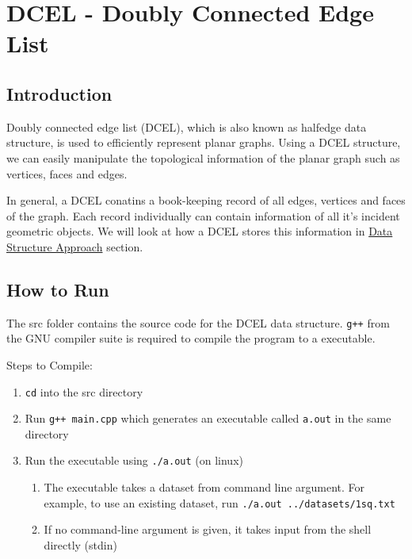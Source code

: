 \hypertarget{dcel---doubly-connected-edge-list}{%
\section{DCEL - Doubly Connected Edge
List}\label{dcel---doubly-connected-edge-list}}

\hypertarget{introduction}{%
\subsection{Introduction}\label{introduction}}

Doubly connected edge list (DCEL), which is also known as halfedge data
structure, is used to efficiently represent planar graphs. Using a DCEL
structure, we can easily manipulate the topological information of the
planar graph such as vertices, faces and edges.

In general, a DCEL conatins a book-keeping record of all edges, vertices
and faces of the graph. Each record individually can contain information
of all it's incident geometric objects. We will look at how a DCEL
stores this information in
\protect\hyperlink{data-structure-approach}{Data Structure Approach}
section.

\hypertarget{how-to-run}{%
\subsection{How to Run}\label{how-to-run}}

The src folder contains the source code for the DCEL data structure.
\texttt{g++} from the GNU compiler suite is required to compile the
program to a executable.

Steps to Compile:

\begin{enumerate}
\def\labelenumi{\arabic{enumi})}
\tightlist
\item
  \texttt{cd} into the src directory
\item
  Run \texttt{g++\ main.cpp} which generates an executable called
  \texttt{a.out} in the same directory
\item
  Run the executable using \texttt{./a.out} (on linux)

  \begin{enumerate}
  \def\labelenumii{\arabic{enumii})}
  \tightlist
  \item
    The executable takes a dataset from command line argument. For
    example, to use an existing dataset, run
    \texttt{./a.out\ ../datasets/1sq.txt}
  \item
    If no command-line argument is given, it takes input from the shell
    directly (stdin)
  \end{enumerate}
\end{enumerate}

